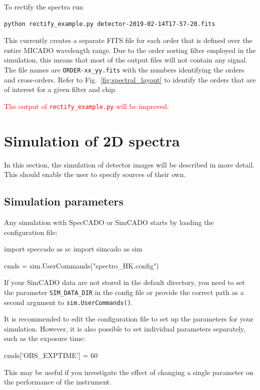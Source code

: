 \documentclass[a4paper,twoside,11pt]{article}
\begin{document}
To rectify the spectra run
\begin{lstlisting}[style=csh]
python rectify_example.py detector-2019-02-14T17-57-20.fits
\end{lstlisting}
This currently creates a separate FITS file for each order that is
defined over the entire MICADO wavelength range. Due to the order
sorting filter employed in the simulation, this means that most of the
output files will not contain any signal. The file names are
\lstinline{ORDER-xx_yy.fits} with the numbers identifying the orders
and cross-orders. Refer to Fig.~\ref{fig:spectral_layout} to identify
the orders that are of interest for a given filter and chip.

\textcolor{red}{The output of \lstinline{rectify_example.py} will be
  improved.}


\section{Simulation of 2D spectra}
\label{sec:simulation}

In this section, the simulation of detector images will be described
in more detail. This should enable the user to specify sources of
their own.

\subsection{Simulation parameters}
\label{ssec:simulation_parameters}

Any simulation with SpecCADO or SimCADO starts by loading the
configuration file:
\begin{pyin}
import speccado as sc
import simcado as sim

cmds = sim.UserCommands("spectro_HK.config")
\end{pyin}
If your SimCADO data are not stored in the default directory, you need
to set the parameter \lstinline{SIM_DATA_DIR} in the config file or
provide the correct path as a second argument to
\lstinline{sim.UserCommands()}.

It is recommended to edit the configuration file to set up the
parameters for your simulation. However, it is also possible to set
individual parameters separately, such as the exposure time:
\begin{pyin}
cmds['OBS_EXPTIME'] = 60
\end{pyin}
This may be useful if you investigate the effect of changing a single
parameter on the performance of the instrument.
\end{document}

